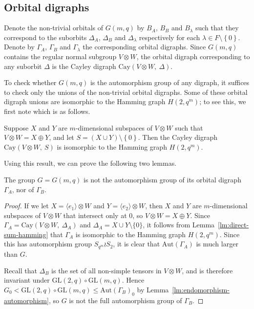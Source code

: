 \documentclass[ALCO, Unicode]{cedram}
\newcommand{\Aut}{\mathrm{Aut}}
\newcommand{\Cay}{\mathrm{Cay}}
\newcommand{\GL}{\mathrm{GL}}
\begin{document}
\subsection{Orbital digraphs}

Denote the non-trivial orbitals of $G{\left(m, q \right)}$ by $B_A$, $B_B$ and $B_\lambda$ such that they correspond to the suborbits $\Delta_A$, $\Delta_B$ and $\Delta_\lambda$ respectively for each $\lambda \in F \setminus \left\{0 \right\}$. Denote by $\Gamma_A$, $\Gamma_B$ and $\Gamma_\lambda$ the corresponding orbital digraphs. Since $G{\left(m, q \right)}$ contains the regular normal subgroup $V \otimes W$, the orbital digraph corresponding to any suborbit $\Delta$ is the Cayley digraph $\Cay{\left(V \otimes W,\ \Delta \right)}$.

To check whether $G{\left(m, q \right)}$ is the automorphism group of any digraph, it suffices to check only the unions of the non-trivial orbital digraphs. Some of these orbital digraph unions are isomorphic to the Hamming graph $H{\left(2, q^m \right)}$; to see this, we first note \cite[Lemma 3.1]{ref:giudici-primitive} which is as follows.

\begin{lemma} \label{lm:direct-sum-hamming}
Suppose $X$ and $Y$ are $m$-dimensional subspaces of $V \otimes W$ such that $V \otimes W = X \oplus Y$, and let $S = \left(X \cup Y \right) \setminus \left\{0 \right\}$. Then the Cayley digraph $\Cay{\left(V \otimes W,\ S \right)}$ is isomorphic to the Hamming graph $H{\left(2, q^m \right)}$.
\end{lemma}

Using this result, we can prove the following two lemmas.

\begin{lemma} \label{lm:Gamma_A,B}
The group $G = G{\left(m, q \right)}$ is not the automorphism group of its orbital digraph $\Gamma_A$, nor of $\Gamma_B$.
\end{lemma}
\begin{proof}
If we let $X = \langle e_1 \rangle \otimes W$ and $Y = \langle e_2 \rangle \otimes W$, then $X$ and $Y$ are $m$-dimensional subspaces of $V \otimes W$ that intersect only at $0$, so $V \otimes W = X \oplus Y$. Since $\Gamma_A = \Cay{\left(V \otimes W,\ \Delta_A \right)}$ and $\Delta_A = X \cup Y \setminus \{0\}$, it follows from Lemma~\ref{lm:direct-sum-hamming} that $\Gamma_A$ is isomorphic to the Hamming graph $H{\left(2, q^m \right)}$. Since this has automorphism group $S_{q^m} \wr S_2$, it is clear that $\Aut{\left(\Gamma_A \right)}$ is much larger than $G$.

Recall that $\Delta_B$ is the set of all non-simple tensors in $V \otimes W$, and is therefore invariant under $\GL{\left(2, q \right)} \circ \GL{\left(m, q \right)}$. Hence $G_0 < \GL{\left(2, q \right)} \circ \GL{\left(m, q \right)} \leqslant \Aut{\left(\Gamma_B \right)}_0$ by Lemma~\ref{lm:endomorphism-automorphism}, so $G$ is not the full automorphism group of $\Gamma_B$.
\end{proof}
\end{document}
